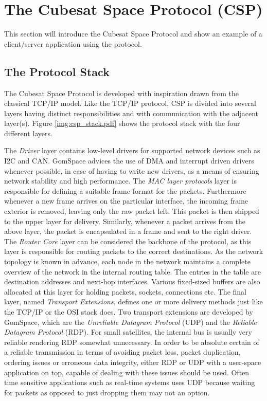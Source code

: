 \chapter{The Cubesat Space Protocol (CSP)}
\label{chapter:csp}
This section will introduce the Cubesat Space Protocol and show an example of a client/server application using the protocol. 

\section{The Protocol Stack}
The Cubesat Space Protocol is developed with inspiration drawn from the classical TCP/IP model. Like the TCP/IP protocol, CSP is divided into several layers having distinct responsibilities and with communication with the adjacent layer(s). Figure \ref{img:csp_stack.pdf} shows the protocol stack with the four different layers.


The \textit{Driver} layer contains low-level drivers for supported network devices such as I2C and CAN. GomSpace advices the use of DMA and interrupt driven drivers whenever possible, in case of having to write new drivers, as a means of ensuring network stability and high performance. The \textit{MAC layer protocols} layer is responsible for defining a suitable frame format for the packets. Furthermore whenever a new frame arrives on the particular interface, the incoming frame exterior is removed, leaving only the raw packet left. This packet is then shipped to the upper layer for delivery. Similarly, whenever a packet arrives from the above layer, the packet is encapsulated in a frame and sent to the right driver. The \textit{Router Core} layer can be considered the backbone of the protocol, as this layer is responsible for routing packets to the correct destinations. As the network topology is known in advance, each node in the network maintains a complete overview of the network in the internal routing table. The entries in the table are destination addresses and next-hop interfaces. Various fixed-sized buffers are also allocated at this layer for holding packets, sockets, connections etc. The final layer, named \textit{Transport Extensions}, defines one or more delivery methods just like the TCP/IP or the OSI stack does. Two transport extensions are developed by GomSpace, which are the \textit{Unreliable Datagram Protocol} (UDP) and the \textit{Reliable Datagram Protocol} (RDP). For small satellites, the internal bus is usually very reliable rendering RDP somewhat unnecessary. In order to be absolute certain of a reliable transmission in terms of avoiding packet loss, packet duplication, ordering issues or erroneous data integrity, either RDP or UDP with a user-space application on top, capable of dealing with these issues should be used. Often time sensitive applications such as real-time systems uses UDP because waiting for packets as opposed to just dropping them may not an option.

